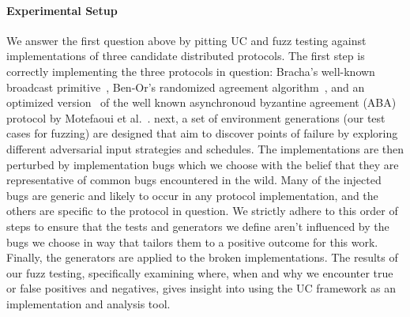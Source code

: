 \paragraph{Experimental Setup}
We answer the first question above by pitting UC and fuzz testing against
implementations of three candidate distributed protocols.  The first step is
correctly implementing the three protocols in question: Bracha's well-known
broadcast primitive~\cite{bracha}, Ben-Or's randomized agreement
algorithm~\cite{benor}, and an optimized version~\cite{aba} of the well known
asynchronoud byzantine agreement (ABA)  protocol by Motefaoui et
al.~\cite{mmr}.  next, a set of environment generations (our test cases for
fuzzing) are designed that aim to discover points of failure by exploring
different adversarial input strategies and schedules.  The implementations are
then perturbed by implementation bugs which we choose with the belief that they
are representative of common bugs encountered in the wild.  Many of the
injected bugs are generic and likely to occur in any protocol implementation,
and the others are specific to the protocol in question.  We strictly adhere to
this order of steps to ensure that the tests and generators we define aren't
influenced by the bugs we choose in way that tailors them to a positive outcome
for this work.  Finally, the generators are applied to the broken
implementations. The results of our fuzz testing, specifically examining where,
when and why we encounter true or false positives and negatives, gives insight
into using the UC framework as an implementation and analysis tool.

